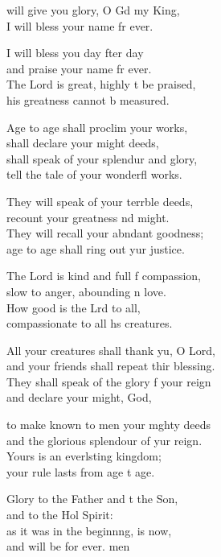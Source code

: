 \settowidth{\versewidth}{All your creatures shall thank you, O Lord, *}
\begin{psalmverse}%
  \begin{patverse}
 will give you glory, O Gd my King, \Med\\
I will bless your name fr ever.

I will bless you day fter day\Med\\
and praise your name fr ever.\\
The Lord is great, highly t be praised,\Med\\
his greatness cannot b measured.

Age to age shall proclim your works,\Med\\
shall declare your might deeds,\\
shall speak of your splendur and glory,\Med\\
tell the tale of your wonderfl works.

They will speak of your terr\pointup{\i}ble deeds,\Med\\
recount your greatness nd might.\\
They will recall your abndant goodness;\Med\\
age to age shall ring out yur justice.

The Lord is kind and full f compassion,\Med\\
slow to anger, abounding \pointup{\i}n love.\\
How good is the Lrd to all,\Med\\
compassionate to all h\pointup{\i}s creatures.

All your creatures shall thank yu, O Lord,\Med\\
and your friends shall repeat thir blessing.\\
They shall speak of the glory f your reign\Med\\
and declare your might,  God,

to make known to men your m\pointup{\i}ghty deeds\Med\\
and the glorious splendour of yur reign.\\
Yours is an everlsting kingdom;\Med\\
your rule lasts from age t age.

Glory to the Father and t the Son,\Med\\
and to the Hol Spirit:\\
as it was in the beginn\pointup{\i}ng, is now,\Med\\
and will be for ever. men
  \end{patverse}
\end{psalmverse}
